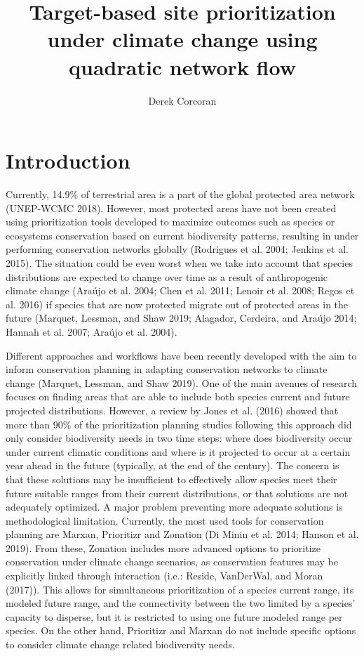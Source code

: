 \documentclass[]{article}
\title{Target-based site prioritization under climate change using quadratic network flow}
\author{Derek Corcoran}
\date{}
\begin{document}
\maketitle

\hypertarget{introduction}{%
\section{Introduction}\label{introduction}}

Currently, 14.9\% of terrestrial area is a part of the global protected area network (UNEP-WCMC 2018). However, most protected areas have not been created using prioritization tools developed to maximize outcomes such as species or ecosystems conservation based on current biodiversity patterns, resulting in under performing conservation networks globally (Rodrigues et al. 2004; Jenkins et al. 2015). The situation could be even worst when we take into account that species distributions are expected to change over time as a result of anthropogenic climate change (Araújo et al. 2004; Chen et al. 2011; Lenoir et al. 2008; Regos et al. 2016) if species that are now protected migrate out of protected areas in the future (Marquet, Lessman, and Shaw 2019; Alagador, Cerdeira, and Araújo 2014; Hannah et al. 2007; Araújo et al. 2004).

Different approaches and workflows have been recently developed with the aim to inform conservation planning in adapting conservation networks to climate change (Marquet, Lessman, and Shaw 2019). One of the main avenues of research focuses on finding areas that are able to include both species current and future projected distributions. However, a review by Jones et al. (2016) showed that more than 90\% of the prioritization planning studies following this approach did only consider biodiversity needs in two time steps: where does biodiversity occur under current climatic conditions and where is it projected to occur at a certain year ahead in the future (typically, at the end of the century). The concern is that these solutions may be insufficient to effectively allow species meet their future suitable ranges from their current distributions, or that solutions are not adequately optimized. A major problem preventing more adequate solutions is methodological limitation. Currently, the most used tools for conservation planning are Marxan, Prioritizr and Zonation (Di Minin et al. 2014; Hanson et al. 2019). From these, Zonation includes more advanced options to prioritize conservation under climate change scenarios, as conservation features may be explicitly linked through interaction (i.e.: Reside, VanDerWal, and Moran (2017)). This allows for simultaneous prioritization of a species current range, its modeled future range, and the connectivity between the two limited by a species' capacity to disperse, but it is restricted to using one future modeled range per species. On the other hand, Prioritizr and Marxan do not include specific options to consider climate change related biodiversity needs.
\end{document}
